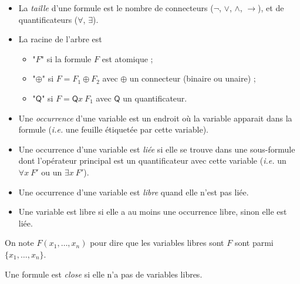 \documentclass[./main]{subfiles}
\begin{document}
  \begin{defn}
    \begin{itemize}
      \item La \textit{taille} d'une formule est le nombre de connecteurs ($\lnot$,  $\lor$,  $\land$,  $\to$), et de quantificateurs ($\forall $, $\exists $).
      \item La racine de l'arbre est 
        \begin{itemize}
          \item "$F$" si la formule $F$ est atomique ;
          \item "$\oplus$" si $F = F_1 \oplus F_2$ avec $\oplus$ un connecteur (binaire ou unaire) ;
          \item "$\mathsf{Q}$" si $F = \mathsf{Q}x\: F_1$ avec $\mathsf{Q}$ un quantificateur.
        \end{itemize}
    \end{itemize}
  \end{defn}

  \begin{defn}
    \begin{itemize}
      \item Une \textit{occurrence} d'une variable est un endroit où la variable apparait dans la formule (\textit{i.e.} une feuille étiquetée par cette variable).
      \item Une occurrence d'une variable est \textit{liée} si elle se trouve dans une sous-formule dont l'opérateur principal est un quantificateur avec cette variable (\textit{i.e.} un $\forall x\: F'$ ou un $\exists x\: F'$).
      \item Une occurrence d'une variable est \textit{libre} quand elle n'est pas liée.
      \item Une variable est libre si elle a au moins une occurrence libre, sinon elle est liée.
    \end{itemize}
  \end{defn}

  \begin{rmk}
    On note $F(x_1, \ldots, x_n)$ pour dire que les variables libres sont $F$ sont parmi $\{x_1, \ldots, x_n\}$.
  \end{rmk}

  \begin{defn}
    Une formule est \textit{close} si elle n'a pas de variables libres.
  \end{defn}
\end{document}
